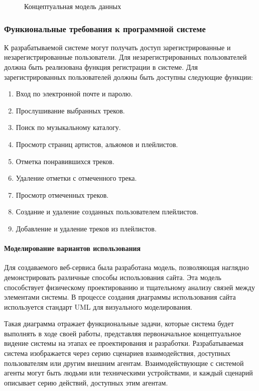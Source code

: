 \begin{figure}[h]
	\caption{Концептуальная модель данных}
	\label{concept_data:image}
\end{figure}

\subsubsection{Функиональные требования к программной системе}

К разрабатываемой системе могут получать доступ зарегистрированные и незарегистрированные пользователи. Для незарегистрированных пользователей должна быть реализована функция регистрации в системе.
Для зарегистрированных пользователей должны быть доступны следующие функции:
\begin{enumerate}
	\item Вход по электронной почте и паролю.
	\item Прослушивание выбранных треков.
	\item Поиск по музыкальному каталогу.
	\item Просмотр страниц артистов, альяомов и плейлистов.
	\item Отметка понравившихся треков.
	\item Удаление отметки с отмеченного трека.
	\item Просмотр отмеченных треков.
	\item Создание и удаление созданных пользователем плейлистов.
	\item Добавление и удаление треков из плейлистов.
\end{enumerate}

\paragraph{Моделирование вариантов использования}

Для создаваемого веб-сервиса была разработана модель, позволяющая наглядно демонстрировать различные способы использования сайта. Эта модель способствует физическому проектированию и тщательному анализу связей между элементами системы. В процессе создания диаграммы использования сайта используется стандарт UML для визуального моделирования\cite{uml2}.

Такая диаграмма отражает функциональные задачи, которые система будет выполнять в ходе своей работы, представляя первоначальное концептуальное видение системы на этапах ее проектирования и разработки. Разрабатываемая система изображается через серию сценариев взаимодействия, доступных пользователям или другим внешним агентам. Взаимодействующие с системой агенты могут быть людьми или техническими устройствами, и каждый сценарий описывает серию действий, доступных этим агентам.

